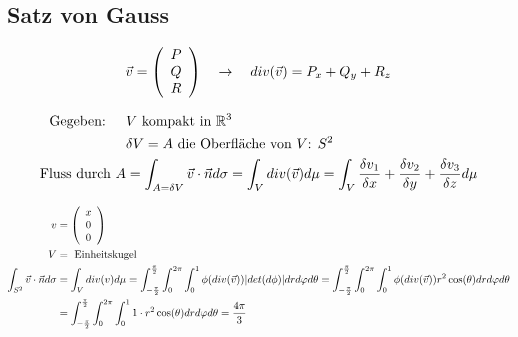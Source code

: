 \documentclass[a4paper]{article}
\begin{document}
	\subsection{Satz von Gauss}
		\begin{fdef}[Divergenz]
			\begin{align*}
				\vec v = \left( \begin{array}{c} P \\ Q \\ R \end{array} \right) \quad \rightarrow \quad div(\vec v) = P_x + Q_y + R_z
			\end{align*}
		\end{fdef}
		\begin{fdef}
			\begin{align*}
				\text{Gegeben: }\quad& V \text{ kompakt in }\mathbb{R}^3\\
				&\delta V = A \text{ die Oberfläche von $V$: }S^2\\
				\text{Fluss durch }A &= \int_{A = \delta V} \vec v \cdot \vec n d \sigma = \int_V div(\vec v) d \mu = \int_V \frac{\delta v_1}{\delta x} + \frac{\delta v_2}{\delta y} + \frac{\delta v_3}{\delta z} d \mu 
			\end{align*}
		\end{fdef}
		
		\begin{fmerke}
			\begin{align*}
				v &= \left( \begin{array}{c} x\\0 \\0 \end{array} \right)\\
				V &= \text{ Einheitskugel} \\
				\int_{S^2} \vec v \cdot \vec n d \sigma &= \int_V div(v) d \mu = \int_{-\frac{\pi}{2}}^{\frac{\pi}{2}} \int_0^{2 \pi} \int_0^1 \phi(div(\vec v))|det(d\phi)|dr d \varphi d\theta = \int_{-\frac{\pi}{2}}^{\frac{\pi}{2}} \int_0^{2 \pi} \int_0^1 \phi(div(\vec v)) r^2 \cos (\theta) dr d \varphi d\theta \\
				&=\int_{-\frac{\pi}{2}}^{\frac{\pi}{2}} \int_0^{2 \pi} \int_0^1 1\cdot  r^2 \cos (\theta) dr d \varphi d\theta = \frac{4 \pi}{3}
			\end{align*}

		\end{fmerke}
		
\end{document}
